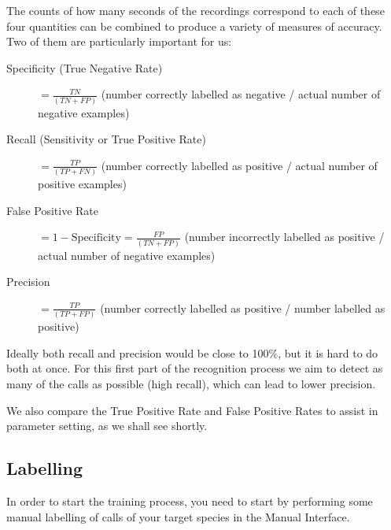 \documentclass{article}
\begin{document}
The counts of how many seconds of the recordings correspond to each of these four quantities can be combined to produce a variety of measures of accuracy. Two of them are particularly important for us:

\begin{description}
\item[Specificity (True Negative Rate)] $= \frac{TN}{(TN + FP)}$ (number correctly labelled as negative / actual number of negative examples)
\item[Recall (Sensitivity or True Positive Rate)] $= \frac{TP}{(TP + FN)}$ (number correctly labelled as positive / actual number of positive examples) 
\item[False Positive Rate] $= 1 - \mathrm{Specificity} = \frac{FP}{(TN + FP)}$ (number incorrectly labelled as positive / actual number of negative examples)
\item[Precision] $= \frac{TP}{(TP + FP)}$ (number correctly labelled as positive / number labelled as positive)
\end{description}

Ideally both recall and precision would be close to 100\%, but it is hard to do both at once. For this first part of the recognition process we aim to detect as many of the calls as possible (high recall), which can lead to lower precision. 

We also compare the True Positive Rate and False Positive Rates to assist in parameter setting, as we shall see shortly.

\subsection{Labelling}

In order to start the training process, you need to start by performing some manual labelling of calls of your target species in the Manual Interface.
\end{document}
